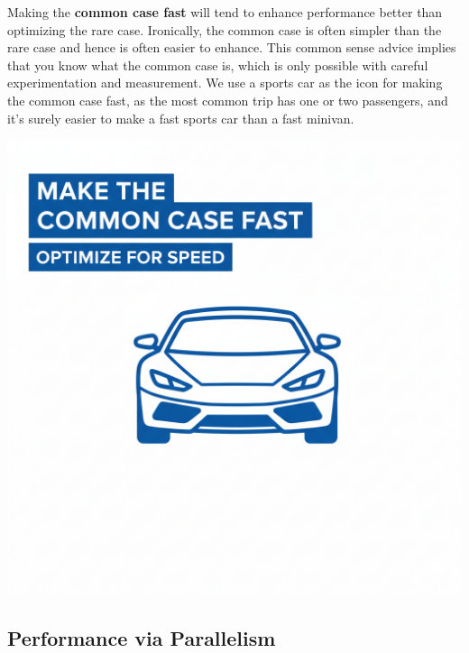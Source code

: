 \documentclass[a4paper,10pt]{article}
\begin{document}
\begin{minipage}[t]{0.7\linewidth}
Making the \textbf{common case fast} will tend to enhance performance better than optimizing the rare case. Ironically, the common case is often simpler than the rare case and hence is often easier to enhance. This common sense advice implies that you know what the common case is, which is only possible with careful experimentation and measurement. We use a sports car as the icon for making the common case fast, as the most common trip has one or two passengers, and it's surely easier to make a fast sports car than a fast minivan.
\end{minipage}
\hfill
\begin{minipage}[t]{0.28\linewidth}
    \centering
    \includegraphics[width=\linewidth]{resources/8_great_ideas_of_computer_architecture/common_case_fast.png}
\end{minipage}

\bigskip

\subsection{Performance via Parallelism}
\end{document}
